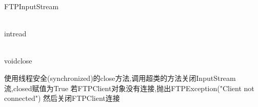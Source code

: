 \begin{XeClass}{FTPInputStream}
\begin{XeMethod}{\XePublic \\ \XeSync}{int}{read}
    \end{XeMethod}

    \begin{XeMethod}{\XePublic \\ \XeSync}{void}{close}
         
 使用线程安全(synchronized)的close方法,调用超类的方法关闭InputStream流,closed赋值为True
 若FTPClient对象没有连接,抛出FTPException("Client not connected")
 然后关闭FTPClient连接

    \end{XeMethod}

\end{XeClass}
